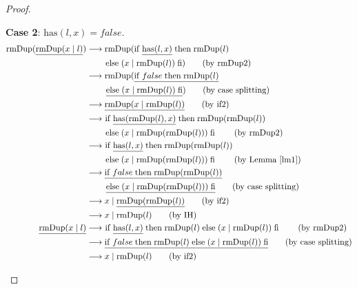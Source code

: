 \documentclass[12pt, a4paper]{article}
\newcommand{\rel}[1]{\mathrel{#1}}
\newcommand{\rmx}[1]{\mathrm{#1}}
\newcommand{\larrow}{\longrightarrow}
\newcommand{\under}{\underline}
\begin{document}
\begin{proof}
\begin{description}
\textbf{Case 2}: $\rmx{has}(l, x) = false$.
\begin{align*}
\rmx{rmDup}(\under{\rmx{rmDup}(x \mid l)})
	&\larrow \rmx{rmDup}(\rel{\rmx{if}} \under{\rmx{has}(l, x)} \rel{\rmx{then}} \rmx{rmDup}(l) \\
	&\quad \quad \rel{\rmx{else}} (x \mid \rmx{rmDup}(l)) \rel{\rmx{fi}}) \tag{by rmDup2} \\
	&\larrow \rmx{rmDup}(\under{\rel{\rmx{if}} false \rel{\rmx{then}} \rmx{rmDup}(l)} \\
	&\quad \quad\ \under{\rel{\rmx{else}} (x \mid \rmx{rmDup}(l)) \rel{\rmx{fi}}}) \tag{by case splitting} \\
	&\larrow \under{\rmx{rmDup}(x \mid \rmx{rmDup}(l))} \tag{by if2} \\
	&\larrow\ \rel{\rmx{if}} \under{\rmx{has}(\rmx{rmDup}(l), x)} \rel{\rmx{then}} \rmx{rmDup}(\rmx{rmDup}(l))\\
	&\quad \quad \rel{\rmx{else}} (x \mid \rmx{rmDup}(\rmx{rmDup}(l))) \rel{\rmx{fi}} \tag{by rmDup2} \\
	&\larrow\ \rel{\rmx{if}} \under{\rmx{has}(l, x)} \rel{\rmx{then}} \rmx{rmDup}(\rmx{rmDup}(l))\\
	&\quad \quad \rel{\rmx{else}} (x \mid \rmx{rmDup}(\rmx{rmDup}(l))) \rel{\rmx{fi}} \tag{by Lemma~\ref{lm1}} \\
	&\larrow \under{\rel{\rmx{if}} false \rel{\rmx{then}} \rmx{rmDup}(\rmx{rmDup}(l))} \\
	&\quad \quad\ \under{\rel{\rmx{else}} (x \mid \rmx{rmDup}(\rmx{rmDup}(l))) \rel{\rmx{fi}}} \tag{by case splitting} \\
	&\larrow x \mid \under{\rmx{rmDup}(\rmx{rmDup}(l))} \tag{by if2} \\	
	&\larrow x \mid \rmx{rmDup}(l) \tag{by IH} \\	
\under{\rmx{rmDup}(x \mid l)}
	&\larrow\ \rel{\rmx{if}} \under{\rmx{has}(l, x)} \rel{\rmx{then}} \rmx{rmDup}(l) \rel{\rmx{else}} (x \mid \rmx{rmDup}(l)) \rel{\rmx{fi}} \tag{by rmDup2} \\
	&\larrow \under{\rel{\rmx{if}} false \rel{\rmx{then}} \rmx{rmDup}(l) \rel{\rmx{else}} (x \mid \rmx{rmDup}(l)) \rel{\rmx{fi}}} \tag{by case splitting} \\
	&\larrow x \mid \rmx{rmDup}(l) \tag{by if2}
\end{align*}
\end{description}
\end{proof}
\end{document}
